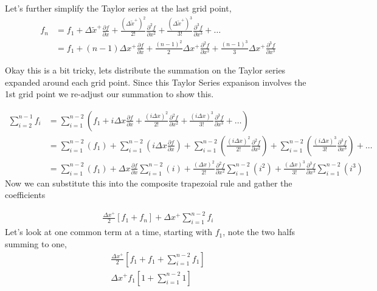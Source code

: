 \documentclass[12pt]{article}
\begin{document}
Let's further simplify the Taylor series at the last grid point,
\begin{align*} 
    f_n &= f_1 + 
    \Delta \widetilde{x}^+\frac{\partial f }{\partial x  } +
    \frac{(\Delta \widetilde{x}^+)^2}{2!}\frac{\partial^2 f }{\partial x^2  } +
    \frac{(\Delta \widetilde{x}^+)^3}{3!}\frac{\partial^3 f }{\partial x^3  } + \dots \\
        &= 
        f_1 +
        \left( n - 1 \right)\Delta x^+ 
        \frac{\partial f}{\partial x} +
        \frac{\left( n - 1 \right)^2}{2}\Delta x^+ 
        \frac{\partial^2 f}{\partial x^2} +
        \frac{\left( n - 1 \right)^3}{3}\Delta x^+ 
        \frac{\partial^3 f}{\partial x^3}
\end{align*}

Okay this is a bit tricky, lets distribute the summation on the Taylor series 
expanded around each grid point. Since this Taylor Series expanison involves 
the 1st grid point we re-adjust our summation to show this.

\begin{align*}
    \sum_{i = 2}^{n - 1} f_i  &= 
    \sum_{i = 1}^{n - 2} \left( 
    f_1 +
    i\Delta x \frac{\partial f }{\partial x } +
    \frac{(i\Delta x)^2}{2!} \frac{\partial^2 f }{\partial x^2 } +
    \frac{(i\Delta x)^3}{3!} \frac{\partial^3 f }{\partial x^3 } + \dots
    \right) \\
                              &=
    \sum_{i = 1}^{n - 2} \left( 
    f_1 \right) +
    \sum_{i = 1}^{n - 2} \left( 
    i\Delta x \frac{\partial f }{\partial x }\right) +
    \sum_{i = 1}^{n - 2} \left( 
    \frac{(i\Delta x)^2}{2!} \frac{\partial^2 f }{\partial x^2 } \right)+
    \sum_{i = 1}^{n - 2} \left( 
    \frac{(i\Delta x)^3}{3!} \frac{\partial^3 f }{\partial x^3 } \right)+ \dots\\ 
                              &=
    \sum_{i = 1}^{n - 2} \left( 
    f_1 \right) +
 \Delta x \frac{\partial f }{\partial x }   
     \sum_{i = 1}^{n - 2} \left( i\right) +
    \frac{(\Delta x)^2}{2!} \frac{\partial^2 f }{\partial x^2 } 
    \sum_{i = 1}^{n - 2} \left( i^2 \right)
    +
    \frac{(\Delta x)^3}{3!} \frac{\partial^3 f }{\partial x^3 } 
    \sum_{i = 1}^{n - 2} \left( i^3 \right)
\end{align*} 
Now we can  substitute this into the composite trapezoial rule and gather the coefficients 


\begin{align*}
    \frac{\Delta x^+ }{2}\left[ f_1 + f_n \right] + \Delta x^+ \sum_{i=1}^{n-2} f_i 
\end{align*}
Let's look at one common term at a time, starting with $f_1$, note the two halfs
summing to one,
\begin{align*} \frac{\Delta x^+}{2}\left[ f_1 + f_1 + \sum_{i=1}^{n-2} f_1 \right] \\
    \Delta x^+ f_1\left[ 1 + \sum_{i=1}^{n-2}1 \right]
\end{align*}
\end{document}
